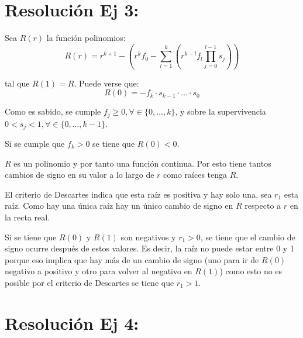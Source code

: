 \documentclass[twocolumn,aps,prl]{revtex4-1}
\begin{document}
% 
%                                 
% 

\section{Resolución Ej 3:}

Sea $R(r)$ la función polinomios:
\begin{equation}\label{eqn:etiqueta1}
    R(r) = r^{k+1} 
        - \left( 
            r^k f_0 
            - \sum_{l=1}^k 
            \left( 
            r^{k-l} f_l \prod_{j=0}^{l-1} s_j  
            \right) 
        \right)
\end{equation}

tal que $R(1)=R$. Puede verse que:
\begin{equation}\label{eqn:etiqueta2}
    R(0) = - f_k \cdot  s_{k-1} \cdot \ldots \cdot s_{0}
\end{equation}

Como es sabido, se cumple $f_j \geq 0, \forall \in \lbrace 0, \ldots, k \rbrace$, y sobre la supervivencia $  0 < s_j < 1, \forall \in \lbrace 0, \ldots, k - 1 \rbrace$.

Si se cumple que $f_k > 0$ se tiene que $R(0) < 0$. 

$R$ es un polinomio y por tanto una función continua. Por esto tiene tantos cambios de signo en su valor a lo largo de $r$ como raíces tenga $R$. 

El criterio de Descartes indica que esta raíz es positiva y hay solo una, sea $r_1$ esta raíz. Como hay una única raíz hay un único cambio de signo en $R$ respecto a $r$ en la recta real. 

Si se tiene que $R(0)$ y $R(1)$ son negativos y $r_1>0$, se tiene que el cambio de signo ocurre después de estos valores. Es decir, la raíz no puede estar entre 0 y 1 porque eso implica que hay más de un cambio de signo (uno para ir de $R(0)$ negativo a positivo y otro para volver al negativo en $R(1)$) como esto no es posible por el criterio de Descartes se tiene que $r_1>1$.

% 
%                             
% 

\section{Resolución Ej 4:}
\end{document}
